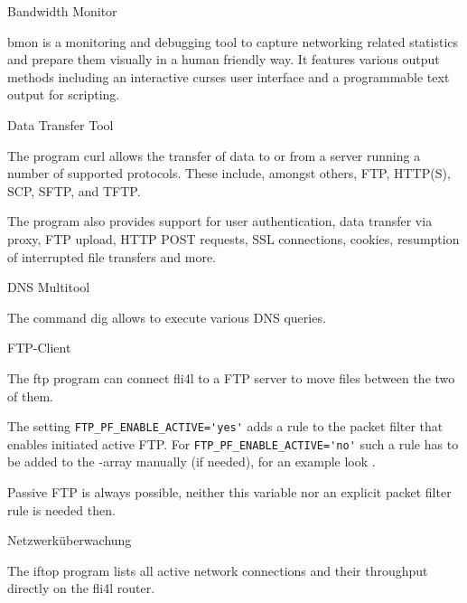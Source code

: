 \begin{description}

 Bandwidth Monitor

    bmon is a monitoring and debugging tool to capture networking related
    statistics and prepare them visually in a human friendly way. It features
    various output methods including an interactive curses user interface and a
    programmable text output for scripting.  

 Data Transfer Tool

    The program curl allows the transfer of data to or from a server running
    a number of supported protocols. These include, amongst others, FTP, HTTP(S),
    SCP, SFTP, and TFTP.

    The program also provides support for user authentication, data transfer
    via proxy, FTP upload, HTTP POST requests, SSL connections, cookies,
    resumption of interrupted file transfers and more.


 DNS Multitool

    The command dig allows to execute various DNS queries.

 FTP-Client

    The ftp program can connect fli4l to a FTP server to move files between the
    two of them.


    The setting \verb+FTP_PF_ENABLE_ACTIVE='yes'+ adds a rule to the packet filter
    that enables initiated active FTP.
    For \verb+FTP_PF_ENABLE_ACTIVE='no'+ such a rule has to be added to the
    -array manually (if needed), for an example look
    .

    Passive FTP is always possible, neither this variable nor an explicit packet
    filter rule is needed then.

 Netzwerküberwachung

    The iftop program lists all active network connections and
    their throughput directly on the fli4l router.


\end{description}
